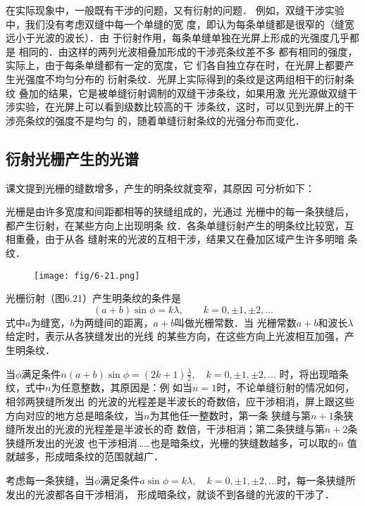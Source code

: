 在实际现象中，一般既有干涉的问题，又有衍射的问题．
例如，双缝干涉实验中，我们没有考虑双缝中每一个单缝的宽
度，即认为每条单缝都是很窄的（缝宽远小于光波的波长）．由
于衍射作用，每条单缝单独在光屏上形成的光强度几乎都是
相同的．由这样的两列光波相叠加形成的干涉亮条纹差不多
都有相同的强度，实际上，由于每条单缝都有一定的宽度，它
们各自独立存在时，在光屏上都要产生光强度不均匀分布的
衍射条纹．光屏上实际得到的条纹是这两组相干的衍射条纹
叠加的结果，它是被单缝衍射调制的双缝干涉条纹，如果用激
光光源做双缝干涉实验，在光屏上可以看到级数比较高的干
涉条纹，这时，可以见到光屏上的干涉亮条纹的强度不是均匀
的，随着单缝衍射条纹的光强分布而变化．

\subsection{衍射光栅产生的光谱}
课文提到光栅的缝数增多，产生的明条纹就变窄，其原因
可分析如下：

光栅是由许多宽度和间距都相等的狭缝组成的，光通过
光栅中的每一条狭缝后，都产生衍射，在某些方向上出现明条
纹．各条单缝衍射产生的明条纹比较宽，互相重叠，由于从各
缝射来的光波的互相干涉，结果又在叠加区域产生许多明暗
条纹．

\begin{figure}[htp]
    \centering
     \texttt{[image: fig/6-21.png]}
    \caption{}
\end{figure}

光栅衍射（图6.21）产生明条纹的条件是
\begin{equation}
    (a+b)\sin\phi=k\lambda,\qquad k=0,\pm1,\pm2,\ldots
\end{equation}
式中$a$为缝宽，$b$为两缝间的距离，$a+b$叫做光栅常数．当
光栅常数$a+b$和波长$\lambda$给定时，表示从各狭缝发出的光线
的某些方向，在这些方向上光波相互加强，产生明条纹．

当$\phi$满足条件$n(a+b)\sin\phi=(2k+1)\frac{\lambda}{2},\quad 
k=0,\pm1,\pm 2,\ldots$ 时，将出现暗条纹，式中$n$为任意整数，其原因是：例
如当$n=1$时，不论单缝衍射的情况如何，相邻两狭缝所发出
的光波的光程差是半波长的奇数倍，应干涉相消，屏上跟这些
方向对应的地方总是暗条纹，当$n$为其他任一整数时，第一条
狭缝与第$n+1$条狭缝所发出的光波的光程差是半波长的奇
数倍，干涉相消；第二条狭缝与第$n+2$条狭缝所发出的光波
也干涉相消……也是暗条纹，光栅的狭缝数越多，可以取的$n$
值就越多，形成暗条纹的范围就越广．

考虑每一条狭缝，当$\phi$满足条件$a\sin\phi=k\lambda,\quad k=0,
\pm1,\pm2,\ldots$时，每一条狭缝所发出的光波都各自干涉相消，
形成暗条纹，就谈不到各缝的光波的干涉了．

